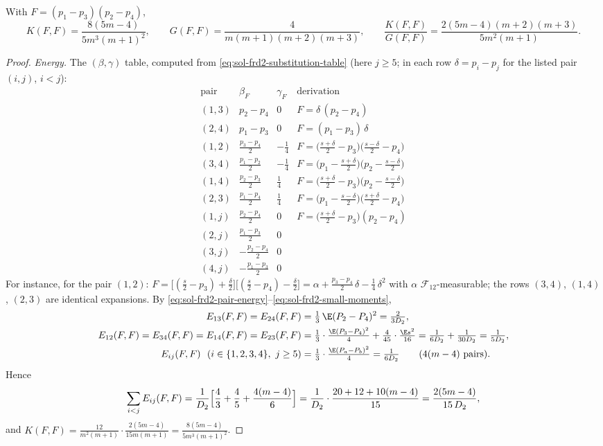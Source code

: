 \documentclass[../main.tex]{subfiles}
\begin{document}
\begin{lemma}
\label{lem:sol-frd2-tworow}
With $F=(p_1-p_3)(p_2-p_4)$,
\begin{equation}
  K(F,F)=\frac{8(5m-4)}{5m^3(m+1)^2},
  \qquad
  G(F,F)=\frac4{m(m+1)(m+2)(m+3)},
  \qquad
  \frac{K(F,F)}{G(F,F)}
  =\frac{2(5m-4)(m+2)(m+3)}{5m^2(m+1)}.
  \label{eq:sol-frd2-tworow}
\end{equation}
\end{lemma}

\begin{proof}
\emph{Energy.}  The $(\beta,\gamma)$ table, computed from
\eqref{eq:sol-frd2-substitution-table} (here $j\ge5$; in each row $\delta=p_i-p_j$
for the listed pair $(i,j)$, $i<j$):
\[
\begin{array}{l|cc|l}
 \text{pair} & \beta_F & \gamma_F & \text{derivation}\\\hline
 (1,3) & p_2-p_4 & 0 & F=\delta\,(p_2-p_4)\\
 (2,4) & p_1-p_3 & 0 & F=(p_1-p_3)\,\delta\\
 (1,2) & \tfrac{p_3-p_4}2 & -\tfrac14 &
  F=\bigl(\tfrac{s+\delta}2-p_3\bigr)\bigl(\tfrac{s-\delta}2-p_4\bigr)\\
 (3,4) & \tfrac{p_1-p_2}2 & -\tfrac14 &
  F=\bigl(p_1-\tfrac{s+\delta}2\bigr)\bigl(p_2-\tfrac{s-\delta}2\bigr)\\
 (1,4) & \tfrac{p_2-p_3}2 & \tfrac14 &
  F=\bigl(\tfrac{s+\delta}2-p_3\bigr)\bigl(p_2-\tfrac{s-\delta}2\bigr)\\
 (2,3) & \tfrac{p_1-p_4}2 & \tfrac14 &
  F=\bigl(p_1-\tfrac{s-\delta}2\bigr)\bigl(\tfrac{s+\delta}2-p_4\bigr)\\
 (1,j) & \tfrac{p_2-p_4}2 & 0 & F=\bigl(\tfrac{s+\delta}2-p_3\bigr)(p_2-p_4)\\
 (2,j) & \tfrac{p_1-p_3}2 & 0 & \\
 (3,j) & -\tfrac{p_2-p_4}2 & 0 & \\
 (4,j) & -\tfrac{p_1-p_3}2 & 0 &
\end{array}
\]
For instance, for the pair $(1,2)$:
$F=\bigl[(\tfrac s2-p_3)+\tfrac\delta2\bigr]
   \bigl[(\tfrac s2-p_4)-\tfrac\delta2\bigr]
 =\alpha+\tfrac{p_3-p_4}2\,\delta-\tfrac14\,\delta^2$
with $\alpha$ $\mathcal F_{12}$-measurable; the rows $(3,4)$, $(1,4)$, $(2,3)$ are
identical expansions.  By
\eqref{eq:sol-frd2-pair-energy}--\eqref{eq:sol-frd2-small-moments},
\begin{align*}
  E_{13}(F,F)=E_{24}(F,F)
  &=\tfrac13\,\E(P_2-P_4)^2=\tfrac2{3D_2},\\
  E_{12}(F,F)=E_{34}(F,F)=E_{14}(F,F)=E_{23}(F,F)
  &=\tfrac13\cdot\tfrac{\E(P_3-P_4)^2}4+\tfrac4{45}\cdot\tfrac{\E s^2}{16}
   =\tfrac1{6D_2}+\tfrac1{30D_2}=\tfrac1{5D_2},\\
  E_{ij}(F,F)\ \ (i\in\{1,2,3,4\},\ j\ge5)
  &=\tfrac13\cdot\tfrac{\E(P_a-P_b)^2}4=\tfrac1{6D_2}
  \qquad(4(m-4)\text{ pairs}).
\end{align*}
Hence
\[
  \sum_{i<j}E_{ij}(F,F)
  =\frac1{D_2}\Bigl[\frac43+\frac45+\frac{4(m-4)}6\Bigr]
  =\frac1{D_2}\cdot\frac{20+12+10(m-4)}{15}
  =\frac{2(5m-4)}{15\,D_2},
\]
and $K(F,F)=\tfrac{12}{m^2(m+1)}\cdot\tfrac{2(5m-4)}{15m(m+1)}
=\tfrac{8(5m-4)}{5m^3(m+1)^2}$.


\end{proof}
\end{document}
